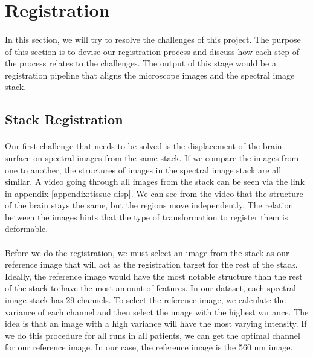\documentclass[12pt,oneside]{report}
\begin{document}
\section{Registration}
\paragraph{}
In this section, we will try to resolve the challenges of this project. The purpose of this section is to devise our registration process and discuss how each step of the process relates to the challenges. The output of this stage would be a registration pipeline that aligns the microscope images and the spectral image stack.

\subsection{Stack Registration}
\paragraph{}
Our first challenge that needs to be solved is the displacement of the brain surface on spectral images from the same stack. If we compare the images from one to another, the structures of images in the spectral image stack are all similar. A video going through all images from the stack can be seen via the link in appendix \ref{appendix:tissue-disp}. We can see from the video that the structure of the brain stays the same, but the regions move independently. The relation between the images hints that the type of transformation to register them is deformable.

\paragraph{}
Before we do the registration, we must select an image from the stack as our reference image that will act as the registration target for the rest of the stack. Ideally, the reference image would have the most notable structure than the rest of the stack to have the most amount of features. In our dataset, each spectral image stack has 29 channels. To select the reference image, we calculate the variance of each channel and then select the image with the highest variance. The idea is that an image with a high variance will have the most varying intensity. If we do this procedure for all runs in all patients, we can get the optimal channel for our reference image. In our case, the reference image is the 560 nm image.
\end{document}
